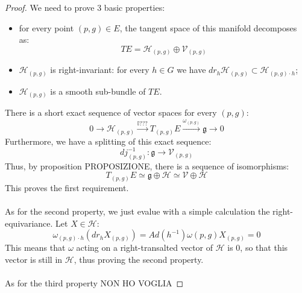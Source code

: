 \documentclass[12pt,a4paper]{report}
\theoremstyle{definition}
\theoremstyle{Theorem}
\theoremstyle{definition}
\theoremstyle{definition}
\theoremstyle{definition}
\begin{document}
	\begin{proof}
		We need to prove 3 basic properties:
		\begin{itemize}
			\item for every point $(p,g)\in E$, the tangent space of this manifold decomposes as:
			$$TE=\mathcal{H}_{(p,g)}\oplus \mathcal{V}_{(p,g)}$$
			\item $\mathcal{H}_{(p,g)}$ is right-invariant: for every $h\in G$ we have $dr_h \mathcal{H}_{(p,g)}\subset \mathcal{H}_{(p,g)\cdot h}$;
			\item $\mathcal{H}_{(p,g)}$ is a smooth sub-bundle of $TE$.
		\end{itemize}
		There is a short exact sequence of vector spaces for every $(p,g)$:
		$$0\rightarrow \mathcal{H}_{(p,g)}\xrightarrow{\mathbb{I}???} T_{(p,g)}E\xrightarrow{\omega_{(p,g)}} \mathfrak{g}\rightarrow0$$
		Furthermore, we have a splitting of this exact sequence: 
		$$dj_{(p,g)}^{-1}:\mathfrak{g}\rightarrow \mathcal{V}_{(p,g)}$$
		Thus, by proposition PROPOSIZIONE, there is a sequence of isomorphisms:
		$$T_{(p,g)}E\simeq\mathfrak{g}\oplus\mathcal{H}\simeq\mathcal{V}\oplus\mathcal{H}$$
		This proves the first requirement.\\
		\\
		As for the second property, we just evalue with a simple calculation the right-equivariance. Let $X\in\mathcal{H}$:
		$$\omega_{(p,g)\cdot h}(dr_hX_{(p,g)})=Ad(h^{-1})\omega{(p,g)}X_{(p,g)}=0$$
		This means that $\omega$ acting on a right-transalted vector of $\mathcal{H}$ is 0, so that this vector is still in $\mathcal{H}$, thus proving the second property.\\
		\\
		As for the third property NON HO VOGLIA
		\end{proof}
\end{document}
